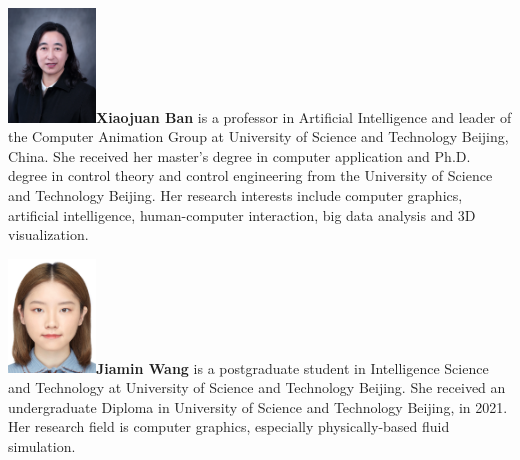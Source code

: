 \documentclass[VANCOUVER,STIX1COL]{WileyNJD-v2}
\providecommand{\DIFaddbegin}{} %
\providecommand{\DIFaddend}{} %
\providecommand{\DIFdelbegin}{} %
\providecommand{\DIFdelend}{} %
\begin{document}
\vspace{4.15ex}

\begin{biography}{\includegraphics[width=66pt,height=86pt]{VANCOUVER/figure/photos/XiaojuanBan.png}}{\textbf{Xiaojuan Ban} is a professor in Artificial Intelligence and leader of the Computer Animation Group at University of Science and Technology Beijing, China. She received her master's degree in computer application and Ph.D. degree in control theory and control engineering from the University of Science and Technology Beijing. Her research interests include computer graphics, artificial intelligence, human-computer interaction, big data analysis and 3D visualization.}
\end{biography}

\vspace{1.3ex}

\DIFdelbegin %
\DIFdelend \DIFaddbegin \begin{biography}{\includegraphics[width=66pt,height=86pt]{VANCOUVER/figure/photos/JiaminWang.jpg}}{\textbf{Jiamin Wang} is a postgraduate student in Intelligence Science and Technology at University of Science and Technology Beijing. She received an undergraduate Diploma in University of Science and Technology Beijing, in 2021. Her research field is computer graphics, especially physically-based fluid simulation.}
\DIFaddend \end{biography}
\end{document}
